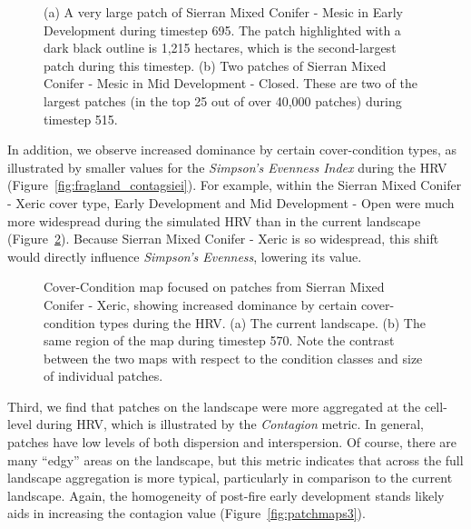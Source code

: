 \begin{figure}[!htbp]
  \centering
  \caption{(a) A very large patch of Sierran Mixed Conifer - Mesic in Early Development during timestep 695. The patch highlighted with a dark black outline is 1,215 hectares, which is the second-largest patch during this timestep. (b) Two patches of Sierran Mixed Conifer - Mesic in Mid Development - Closed. These are two of the largest patches (in the top 25 out of over 40,000 patches) during timestep 515.} 
  \label{fig:patchmaps1}
\end{figure}

In addition, we observe increased dominance by certain cover-condition types, as illustrated by smaller values for the \emph{Simpson's Evenness Index} during the HRV (Figure~\ref{fig:fragland_contagsiei}). For example, within the Sierran Mixed Conifer - Xeric cover type, Early Development and Mid Development - Open were much more widespread during the simulated HRV than in the current landscape (Figure~\ref{fig:patchmaps2}). Because Sierran Mixed Conifer - Xeric is so widespread, this shift would directly influence \emph{Simpson's Evenness}, lowering its value.

\begin{figure}[!htbp]
  \centering
  \caption{Cover-Condition map focused on patches from Sierran Mixed Conifer - Xeric, showing increased dominance by certain cover-condition types during the HRV. (a) The current landscape. (b) The same region of the map during timestep 570. Note the contrast between the two maps with respect to the condition classes and size of individual patches.} 
  \label{fig:patchmaps2}
\end{figure}


Third, we find that patches on the landscape were more aggregated at the cell-level during HRV, which is illustrated by the \emph{Contagion} metric. In general, patches have low levels of both dispersion and interspersion. Of course, there are many ``edgy'' areas on the landscape, but this metric indicates that across the full landscape aggregation is more typical, particularly in comparison to the current landscape. Again, the homogeneity of post-fire early development stands likely aids in increasing the contagion value (Figure~\ref{fig:patchmaps3}). 

